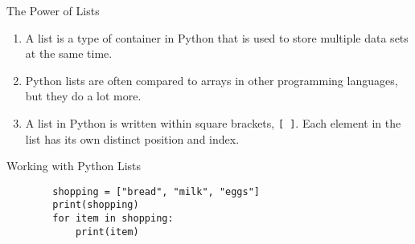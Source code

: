 \documentclass[../main.tex]{subfiles}
\begin{document}
\begin{frame}[fragile]{The Power of Lists}
  \begin{enumerate} \justifying
  \item A list is a type of container in Python that is used to store \alert{multiple data sets at the same time}. 
  \item Python lists are often compared to arrays in other programming languages, but they do a lot more.
  \item A list in Python is written within square brackets, \texttt{[ ]}. Each element in the list has its own distinct position and index. 
  \end{enumerate}

  \begin{exercise}{Working with Python Lists}
      \begin{lstlisting}
        shopping = ["bread", "milk", "eggs"]
        print(shopping)
        for item in shopping:
            print(item)                                                             
      \end{lstlisting}
  \end{exercise}
\end{frame}
\end{document}

